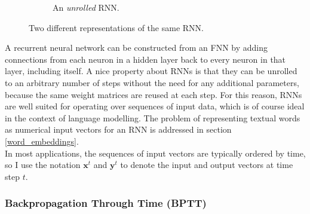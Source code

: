 \documentclass[a4paper, 12pt]{report}
\newcommand{\tit}[1]{\textit{#1}}
\begin{document}
\begin{figure}[h]
\begin{subfigure}{0.7\linewidth}
	\caption{An \tit{unrolled} RNN.}
	\label{fig:rnn_unrolled}
\end{subfigure}
\caption{Two different representations of the same RNN.}
\end{figure}

A recurrent neural network can be constructed from an FNN by adding connections from each neuron in a hidden layer back to every neuron in that layer, including itself. A nice property about RNNs is that they can be unrolled to an arbitrary number of steps without the need for any additional parameters, because the same weight matrices are reused at each step. For this reason, RNNs are well suited for operating over sequences of input data, which is of course ideal in the context of language modelling. The problem of representing textual words as numerical input vectors for an RNN is addressed in section \ref{word_embeddings}. \\

In most applications, the sequences of input vectors are typically ordered by time, so I use the notation $\mathbf{x}^t$ and $\mathbf{y}^t$ to denote the input and output vectors at time step $t$.

\subsubsection{Backpropagation Through Time (BPTT)}
\end{document}
